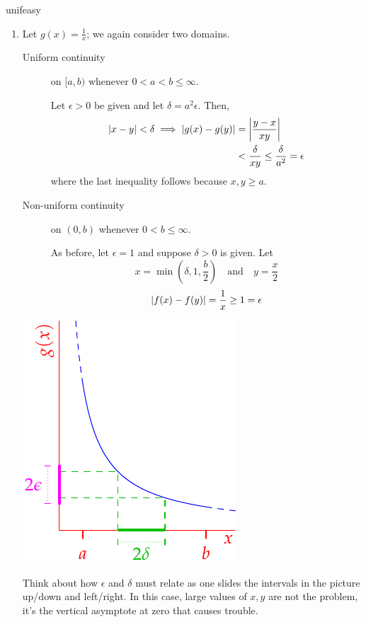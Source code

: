 \begin{examples}{}{unifeasy}
\begin{enumerate}
		\item Let $g(x)=\frac 1x$; we again consider two domains.\par
		\begin{minipage}[t]{0.65\linewidth}\vspace{-8pt}
			\begin{description}
				\item[Uniform continuity] on $[a,b)$ whenever $0<a<b\le \infty$.\par
				Let $\epsilon>0$ be given and let $\delta=a^2\epsilon$. Then,
				\begin{align*}
					\left| x-y\right|<\delta \implies \left| g(x)-g(y)\right|
					&=\left| \frac{y-x}{xy}\right|\\
					&<\frac\delta{xy}\le\frac{\delta}{a^2}
						=\epsilon
				\end{align*}
				where the last inequality follows because $x,y\ge a$.
				\item[Non-uniform continuity] on $(0,b)$ whenever $0<b\le\infty$.\par
				As before, let $\epsilon=1$ and suppose $\delta>0$ is given. 
				Let
				\[
					x=\min\left(\delta,1,\frac b2\right) 
					\quad\text{and}\quad 
					y=\frac x2
				\]
				\[
					\left| f(x)-f(y)\right|=\frac 1x\ge 1=\epsilon
				\]
			\end{description}
		\end{minipage}
		\hfill
		\begin{minipage}[t]{0.34\linewidth}\vspace{0pt}
			\flushright\includegraphics[scale=0.95]{unifcont2}
		\end{minipage}\bigbreak
		Think about how $\epsilon$ and $\delta$ must relate as one slides the intervals in the picture up/down and left/right. In this case, large values of $x,y$ are not the problem, it's the vertical asymptote at zero that causes trouble. 
		
	\end{enumerate}
\end{examples}



